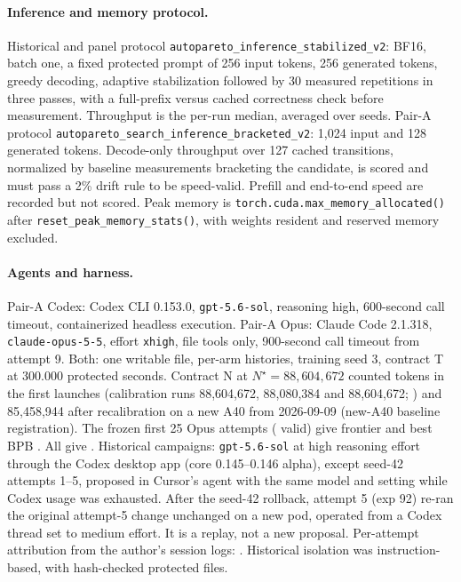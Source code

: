 \documentclass{article}
\begin{document}
\begin{table}[H]
\caption{Recorded software environment by era. Panel, Pair-A, E1 and Opus-test rows are read from their run records. Other rows are from the provenance audit.}\label{tab:env}
\centering\scriptsize
\end{table}

\paragraph{Inference and memory protocol.} Historical and panel protocol \texttt{autopareto\_inference\_stabilized\_v2}: BF16, batch one, a fixed protected prompt of 256 input tokens, 256 generated tokens, greedy decoding, adaptive stabilization followed by 30 measured repetitions in three passes, with a full-prefix versus cached correctness check before measurement. Throughput is the per-run median, averaged over seeds. Pair-A protocol \texttt{autopareto\_search\_inference\_bracketed\_v2}: 1,024 input and 128 generated tokens. Decode-only throughput over 127 cached transitions, normalized by baseline measurements bracketing the candidate, is scored and must pass a 2\% drift rule to be speed-valid. Prefill and end-to-end speed are recorded but not scored. Peak memory is \texttt{torch.cuda.max\_memory\_allocated()} after \texttt{reset\_peak\_memory\_stats()}, with weights resident and reserved memory excluded.

\paragraph{Agents and harness.} Pair-A Codex: Codex CLI 0.153.0, \texttt{gpt-5.6-sol}, reasoning high, 600-second call timeout, containerized headless execution. Pair-A Opus: Claude Code 2.1.318, \texttt{claude-opus-5-5}, effort \texttt{xhigh}, file tools only, 900-second call timeout from attempt 9. Both: one writable file, per-arm histories, training seed 3, contract T at 300.000 protected seconds. Contract N at $N^\star=88{,}604{,}672$ counted tokens in the first launches (calibration runs 88,604,672, 88,080,384 and 88,604,672; ) and 85,458,944 after recalibration on a new A40 from 2026-09-09 (new-A40 baseline registration). The frozen first 25 Opus attempts (\CROpValidFrozen{} valid) give frontier \CROpFrontierFrozen{} and best BPB \CROpBestFrozen. All \CROpAttempts{} give \CROpFrontierExtended. Historical campaigns: \texttt{gpt-5.6-sol} at high reasoning effort through the Codex desktop app (core 0.145--0.146 alpha), except seed-42 attempts 1--5, proposed in Cursor's agent with the same model and setting while Codex usage was exhausted. After the seed-42 rollback, attempt 5 (exp 92) re-ran the original attempt-5 change unchanged on a new pod, operated from a Codex thread set to medium effort. It is a replay, not a new proposal. Per-attempt attribution from the author's session logs: . Historical isolation was instruction-based, with hash-checked protected files.
\end{document}
